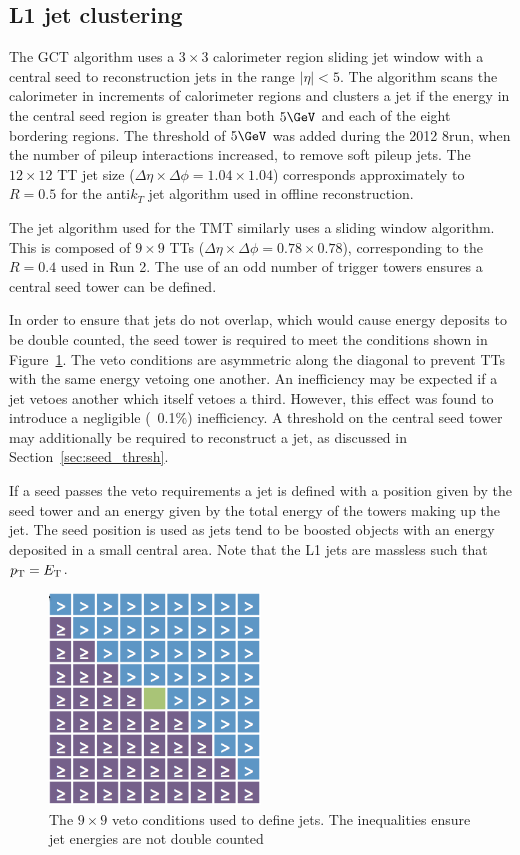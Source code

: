 \subsection{L1 jet clustering}
\label{sec:jet_algo}
The GCT algorithm uses a $3\times3$ calorimeter region sliding jet window with a central seed 
to reconstruction jets in the range $|\eta| < 5$. The algorithm scans the calorimeter in increments
of calorimeter regions and clusters a jet if the energy in the central seed region is greater than 
both $5\GeV$ and each of the eight bordering regions. The threshold of $5\GeV$ was added during 
the 2012 8\TeV run, when the number of pileup interactions increased, to remove soft pileup jets.
The $12\times12$ TT jet size ($\Delta\eta\times\Delta\phi = 1.04\times1.04$) corresponds 
approximately to $R=0.5$ for the anti$k_T$ jet algorithm used in offline reconstruction.

The jet algorithm used for the TMT similarly uses a sliding window algorithm. This
is composed of $9\times9$ TTs ($\Delta\eta\times\Delta\phi = 0.78\times0.78$), corresponding 
to the $R=0.4$ used in Run 2. The use of an odd number of trigger towers ensures a central 
seed tower can be defined. 

In order to ensure that jets do not overlap, which would cause energy deposits 
to be double counted, the seed tower is required to meet the conditions
shown in Figure~\ref{mask}. The veto conditions are asymmetric along the diagonal to prevent  
TTs with the same energy vetoing one another. An inefficiency may be expected 
if a jet vetoes another which itself vetoes a third. However, this effect was found to 
introduce a negligible (~0.1\%) inefficiency. A threshold on the central seed tower may 
additionally be required to reconstruct a jet, as discussed in Section~\ref{sec:seed_thresh}. 

If a seed passes the veto requirements a jet is defined with a position 
given by the seed tower and an energy given by the total energy of the towers
making up the jet. The seed position is used as jets tend to be boosted
 objects with an energy deposited in a small central area. 
Note that the L1 jets are massless such that ${p_{\text T}} = {E_{\text T}}$.

\begin{figure}
\centering
    \includegraphics[width=0.5\textwidth]{./Figures/triggerUpgrade/mask.png}
  \caption{The $9\times9$ veto conditions used to define jets. The inequalities ensure
  jet energies are not double counted}
  \label{mask}
\end{figure}

